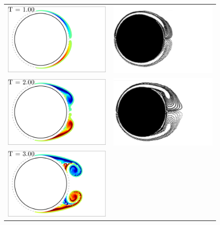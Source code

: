 \begin{figure}
 \begin{center}
 \begin{tabular}{cc}
 \includegraphics[width=6.5cm]{./Figures/results/static/vortices_T1_00.pdf}  &
 \includegraphics[width=6.5cm]{./Figures/results/static/KOU_Re1000_T1.png}  \\
 \includegraphics[width=6.5cm]{./Figures/results/static/vortices_T2_00.pdf}  &
 \includegraphics[width=6.5cm]{./Figures/results/static/KOU_Re1000_T2.png}  \\
 \includegraphics[width=6.5cm]{./Figures/results/static/vortices_T3_00.pdf}  &

\end{tabular}
\end{center}
\end{figure}
